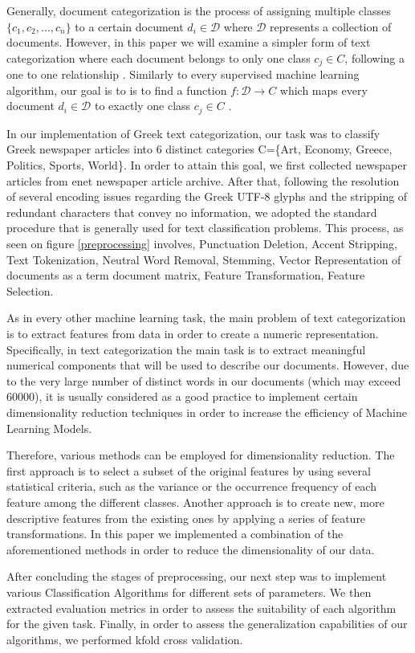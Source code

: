 \documentclass[10pt,journal,compsoc]{IEEEtran}
\begin{document}
\par
Generally, document categorization is the process of assigning
multiple classes $\{c_1,c_2,...,c_n\}$ to a certain document
$d_i\in \mathcal{D}$ where $\mathcal{D}$ represents a 
collection of documents.
However, in this paper we will examine a simpler form 
of text categorization where each document belongs to only 
one class $c_j\in C$, 
following a one to one relationship \cite{a1}.
Similarly to every supervised machine learning algorithm,
our goal is to is to find a function $f: \mathcal{D}\rightarrow C$
which maps every document $d_i\in \mathcal{D}$ to exactly one
class $c_j \in C$ .
\par
In our implementation of Greek text categorization, our task
was to classify Greek newspaper articles into 6 distinct 
categories C=\{Art, Economy, Greece, Politics, Sports, World\}.
In order to attain this goal, we first collected newspaper articles
from enet newspaper article archive.
After that, following the resolution of several encoding issues 
regarding the Greek UTF-8 glyphs and the stripping of redundant
characters that convey no information, we adopted
the standard procedure that is generally used for text classification
problems.
This process, as seen on figure \ref{preprocessing} involves, 
Punctuation Deletion, Accent Stripping, Text Tokenization, 
Neutral Word Removal, Stemming, 
Vector Representation of documents as a term document matrix, 
Feature Transformation, Feature Selection.
\par
As in every other machine learning task, the main problem of text
categorization is to extract features from data in order to create
a numeric representation.
Specifically, in text categorization the main task is to extract
meaningful numerical components that will be used to describe
our documents.
However, due to the very large number of distinct words in our
documents (which may exceed 60000), 
it is usually considered as a good practice to
implement certain dimensionality reduction techniques in
order to increase the efficiency of Machine Learning Models.
\par
Therefore, various methods can be employed for dimensionality 
reduction.
The first approach is to select a subset of the original features
by using several statistical criteria, such as the variance
or the occurrence frequency of each feature among the 
different classes.
Another approach is to create new, more descriptive features
from the existing ones by applying a series of feature 
transformations.
In this paper we implemented a combination of the aforementioned
methods in order to reduce the dimensionality of our data.
\par
After concluding the stages of preprocessing, our next step
was to implement various Classification Algorithms for different
sets of parameters.
We then extracted evaluation metrics in order to assess the
suitability of each algorithm for the given task.
Finally, in order to assess the generalization capabilities 
of our algorithms, we performed kfold cross validation.
\end{document}
